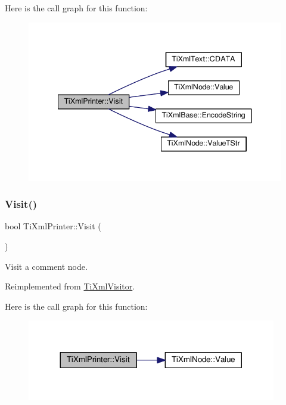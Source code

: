 Here is the call graph for this function\+:
\nopagebreak
\begin{figure}[H]
\begin{center}
\leavevmode
\includegraphics[width=341pt]{class_ti_xml_printer_a0857c5d32c59b9a257f9a49cb9411df5_cgraph}
\end{center}
\end{figure}
\mbox{\label{class_ti_xml_printer_a9870423f5603630e6142f6bdb66dfb57}} 
\subsubsection{\texorpdfstring{Visit()}{Visit()}\hspace{0.1cm}{\footnotesize\ttfamily [3/4]}}
{\footnotesize\ttfamily bool Ti\+Xml\+Printer\+::\+Visit (\begin{DoxyParamCaption}\item[{const \hyperlink{class_ti_xml_comment}{Ti\+Xml\+Comment} \&}]{ }\end{DoxyParamCaption})\hspace{0.3cm}{\ttfamily [virtual]}}



Visit a comment node. 



Reimplemented from \hyperlink{class_ti_xml_visitor_a53a60e7a528627b31af3161972cc7fa2}{Ti\+Xml\+Visitor}.

Here is the call graph for this function\+:
\nopagebreak
\begin{figure}[H]
\begin{center}
\leavevmode
\includegraphics[width=308pt]{class_ti_xml_printer_a9870423f5603630e6142f6bdb66dfb57_cgraph}
\end{center}
\end{figure}
\mbox{\label{class_ti_xml_printer_a08591a15c9a07afa83c24e08b03d6358}} 
